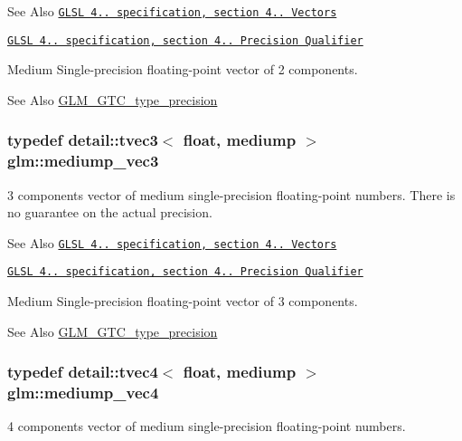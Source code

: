 \begin{DoxySeeAlso}{See Also}
\href{http://www.opengl.org/registry/doc/GLSLangSpec.4.20.8.pdf}{\tt G\-L\-S\-L 4.. specification, section 4.. Vectors} 

\href{http://www.opengl.org/registry/doc/GLSLangSpec.4.20.8.pdf}{\tt G\-L\-S\-L 4.. specification, section 4.. Precision Qualifier}
\end{DoxySeeAlso}
Medium Single-\/precision floating-\/point vector of 2 components. \begin{DoxySeeAlso}{See Also}
\hyperlink{group__gtc__type__precision}{G\-L\-M\-\_\-\-G\-T\-C\-\_\-type\-\_\-precision} 
\end{DoxySeeAlso}
\hypertarget{group__core__precision_ga10acc767a046b85205f52ce7f834626f}{
\subsubsection[{mediump\-\_\-vec3}]{\setlength{\rightskip}{0pt plus 5cm}typedef detail\-::tvec3$<$ float, mediump $>$ {\bf glm\-::mediump\-\_\-vec3}}}\label{group__core__precision_ga10acc767a046b85205f52ce7f834626f}
3 components vector of medium single-\/precision floating-\/point numbers. There is no guarantee on the actual precision.

\begin{DoxySeeAlso}{See Also}
\href{http://www.opengl.org/registry/doc/GLSLangSpec.4.20.8.pdf}{\tt G\-L\-S\-L 4.. specification, section 4.. Vectors} 

\href{http://www.opengl.org/registry/doc/GLSLangSpec.4.20.8.pdf}{\tt G\-L\-S\-L 4.. specification, section 4.. Precision Qualifier}
\end{DoxySeeAlso}
Medium Single-\/precision floating-\/point vector of 3 components. \begin{DoxySeeAlso}{See Also}
\hyperlink{group__gtc__type__precision}{G\-L\-M\-\_\-\-G\-T\-C\-\_\-type\-\_\-precision} 
\end{DoxySeeAlso}
\hypertarget{group__core__precision_ga2527a7f322907fecd58bef0a7a9c3ecd}{
\subsubsection[{mediump\-\_\-vec4}]{\setlength{\rightskip}{0pt plus 5cm}typedef detail\-::tvec4$<$ float, mediump $>$ {\bf glm\-::mediump\-\_\-vec4}}}\label{group__core__precision_ga2527a7f322907fecd58bef0a7a9c3ecd}
4 components vector of medium single-\/precision floating-\/point numbers.

